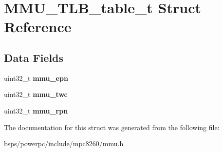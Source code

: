 \hypertarget{structMMU__TLB__table__t}{}\section{M\+M\+U\+\_\+\+T\+L\+B\+\_\+table\+\_\+t Struct Reference}
\label{structMMU__TLB__table__t}
\subsection*{Data Fields}
\begin{DoxyCompactItemize}
\item 
\mbox{\label{structMMU__TLB__table__t_aa79181b6be869f625503a2b6913567f0}} 
uint32\+\_\+t {\bfseries mmu\+\_\+epn}
\item 
\mbox{\label{structMMU__TLB__table__t_a4e9eecd5e3be7eb771eec41e567be52d}} 
uint32\+\_\+t {\bfseries mmu\+\_\+twc}
\item 
\mbox{\label{structMMU__TLB__table__t_a0efad3485e64537f953a492495d65c54}} 
uint32\+\_\+t {\bfseries mmu\+\_\+rpn}
\end{DoxyCompactItemize}


The documentation for this struct was generated from the following file\+:\begin{DoxyCompactItemize}
\item 
bsps/powerpc/include/mpc8260/mmu.\+h\end{DoxyCompactItemize}
